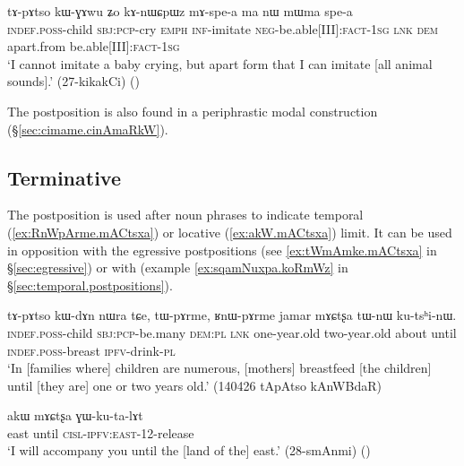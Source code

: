  \begin{exe}
 \ex \label{ex:mAspea.ma.nW.ma}
 \gll tɤ-pɤtso kɯ-ɣɤwu ʑo kɤ-nɯɕpɯz mɤ-spe-a ma nɯ mɯma spe-a \\
 \textsc{indef}.\textsc{poss}-child \textsc{sbj}:\textsc{pcp}-cry \textsc{emph} \textsc{inf}-imitate \textsc{neg}-be.able[III]:\textsc{fact}-\textsc{1sg} \textsc{lnk} \textsc{dem} apart.from be.able[III]:\textsc{fact}-\textsc{1sg}  \\
\glt  `I cannot imitate a baby crying, but apart form that I can imitate [all animal sounds].' (27-kikakCi)
()
\end{exe}

The postposition  is also found in a periphrastic modal construction   (§\ref{sec:cimame.cinAmaRkW}).

\subsection{Terminative} \label{sec:terminative}  
The postposition  is used after noun phrases to indicate temporal (\ref{ex:RnWpArme.mACtsxa}) or locative (\ref{ex:akW.mACtsxa}) limit. It can be used in opposition with the egressive postpositions (see \ref{ex:tWmAmke.mACtsxa} in §\ref{sec:egressive}) or with  (example \ref{ex:sqamNuxpa.koRmWz} in §\ref{sec:temporal.postpositions}).

\begin{exe}
\ex \label{ex:RnWpArme.mACtsxa}
 \gll tɤ-pɤtso kɯ-dɤn nɯra tɕe, tɯ-pɤrme, ʁnɯ-pɤrme jamar mɤɕtʂa tɯ-nɯ ku-tsʰi-nɯ. \\
 \textsc{indef}.\textsc{poss}-child \textsc{sbj}:\textsc{pcp}-be.many \textsc{dem}:\textsc{pl} \textsc{lnk} one-year.old two-year.old about until \textsc{indef}.\textsc{poss}-breast \textsc{ipfv}-drink-\textsc{pl} \\
 \glt `In [families where] children are numerous, [mothers] breastfeed [the children] until [they are] one or two years old.' (140426 tApAtso kAnWBdaR)
\end{exe}

\begin{exe}
\ex \label{ex:akW.mACtsxa}
 \gll akɯ mɤɕtʂa ɣɯ-ku-ta-lɤt \\ 
east until \textsc{cisl}-\textsc{ipfv}:\textsc{east}-1\fl{}2-release \\
\glt  `I will accompany you until the [land of the] east.' (28-smAnmi) ()
\end{exe}

